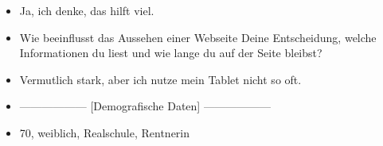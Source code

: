 {\begin{itemize}[]
            \item {} Ja, ich denke, das hilft viel.
            \item {} Wie beeinflusst das Aussehen einer Webseite Deine Entscheidung, welche Informationen du liest und wie lange du auf der Seite bleibst?
            \item {} Vermutlich stark, aber ich nutze mein Tablet nicht so oft.
            \item {------------------} [Demografische Daten] {------------------}
            \item {} 70, weiblich, Realschule, Rentnerin
      \end{itemize}}
\nolinenumbers
